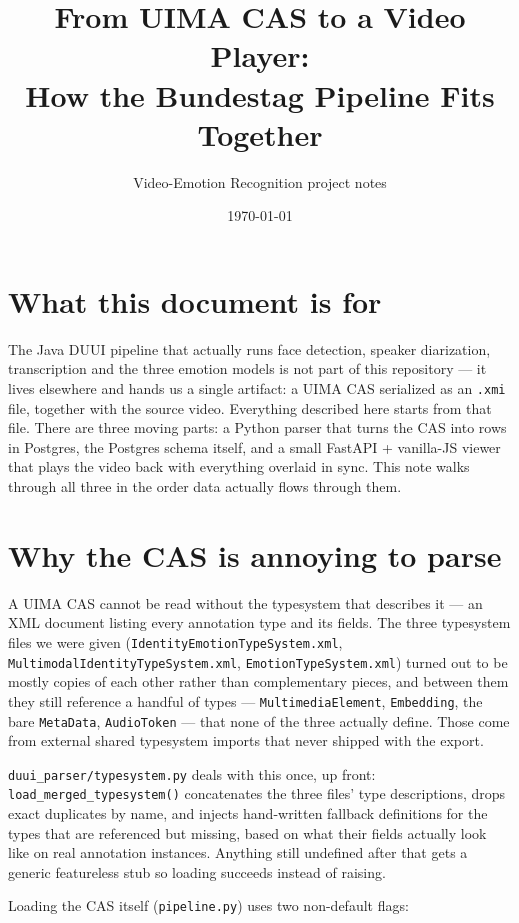 \documentclass[11pt]{article}
\title{From UIMA CAS to a Video Player:\\ How the Bundestag Pipeline Fits Together}
\author{Video-Emotion Recognition project notes}
\date{\today}
\begin{document}
\maketitle

\section{What this document is for}

The Java DUUI pipeline that actually runs face detection, speaker diarization,
transcription and the three emotion models is not part of this repository ---
it lives elsewhere and hands us a single artifact: a UIMA CAS serialized as an
\texttt{.xmi} file, together with the source video. Everything described here
starts from that file. There are three moving parts: a Python parser that
turns the CAS into rows in Postgres, the Postgres schema itself, and a small
FastAPI + vanilla-JS viewer that plays the video back with everything overlaid
in sync. This note walks through all three in the order data actually flows
through them.

\section{Why the CAS is annoying to parse}

A UIMA CAS cannot be read without the typesystem that describes it --- an XML
document listing every annotation type and its fields. The three typesystem
files we were given
(\texttt{IdentityEmotionTypeSystem.xml},
\texttt{MultimodalIdentityTypeSystem.xml},
\texttt{EmotionTypeSystem.xml}) turned out to be mostly copies of each other
rather than complementary pieces, and between them they still reference a
handful of types --- \texttt{MultimediaElement}, \texttt{Embedding}, the bare
\texttt{MetaData}, \texttt{AudioToken} --- that none of the three actually
define. Those come from external shared typesystem imports that never shipped
with the export.

\texttt{duui\_parser/typesystem.py} deals with this once, up front:
\texttt{load\_merged\_typesystem()} concatenates the three files'
type descriptions, drops exact duplicates by name, and injects hand-written
fallback definitions for the types that are referenced but missing, based on
what their fields actually look like on real annotation instances. Anything
still undefined after that gets a generic featureless stub so loading
succeeds instead of raising.

Loading the CAS itself
(\texttt{pipeline.py}) uses two non-default flags:
\end{document}
